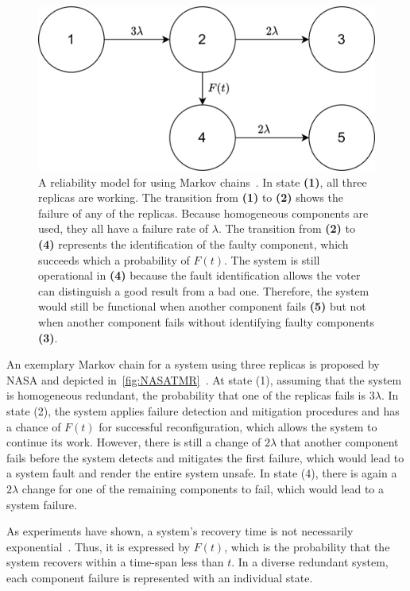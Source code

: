 \begin{figure}[!hb]
	\centering
	\includegraphics[width=0.8\linewidth]{images/TriplexSystemNASA}
	\caption{A reliability model for  using Markov chains~\cite{NASAMarkovChains}. In state \textbf{(1)}, all three replicas are working. The transition from \textbf{(1)} to \textbf{(2)} shows the failure of any of the replicas. Because homogeneous components are used, they all have a failure rate of $\lambda$. The transition from \textbf{(2)} to \textbf{(4)} represents the identification of the faulty component, which succeeds which a probability of $F(t)$. The system is still operational in \textbf{(4)} because the fault identification allows the voter can distinguish a good result from a bad one. Therefore, the system would still be functional when another component fails \textbf{(5)} but not when another component fails without identifying faulty components \textbf{(3)}.}
	\label{fig:NASATMR}
\end{figure}

An exemplary Markov chain for a system using three replicas is proposed by NASA and depicted in~\autoref{fig:NASATMR}~\cite{NASAMarkovChains}.
At state (1), assuming that the system is homogeneous redundant, the probability that one of the replicas fails is $3\lambda$.
In state (2), the system applies failure detection and mitigation procedures and has a chance of $F(t)$ for successful reconfiguration, which allows the system to continue its work.
However, there is still a change of $2\lambda$ that another component fails before the system detects and mitigates the first failure, which would lead to a system fault and render the entire system unsafe.
In state (4), there is again a $2\lambda$ change for one of the remaining components to fail, which would lead to a system failure.

As experiments have shown, a system's recovery time is not necessarily exponential~\cite{TheoryAndPracticeReliableSystem}.
Thus, it is expressed by $F(t)$, which is the probability that the system recovers within a time-span less than $t$.
In a diverse redundant system, each component failure is represented with an individual state.

